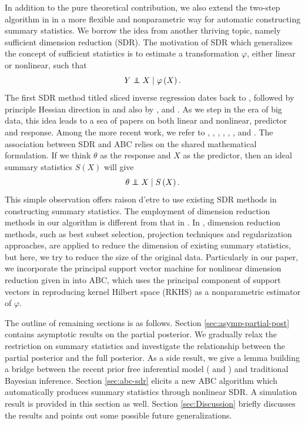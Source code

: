 In addition to the pure theoretical contribution, we also extend the{}
{two-step}{} algorithm in \citet{fearnhead2012constructing}
in a more flexible and nonparametric way for automatic constructing
summary statistics. We borrow the idea from another thriving topic,
namely sufficient dimension reduction (SDR). The motivation of SDR
which generalizes the concept of sufficient statistics is to estimate{}
{a} transformation $\varphi$, either{}
linear or nonlinear, such that 
\begin{equation}
Y\independent X\mid\varphi\left(X\right).\label{eq:sdr}
\end{equation}
 The first SDR method titled sliced inverse regression dates back
to \citet{li1991sliced}, followed by principle Hessian direction
in \citet{li1992principal} and also by \citet{1991}, and \citet{cook1998principal}.
As we step in the era of big data, this idea leads to a sea of papers
on both linear and nonlinear, predictor and response. Among the more
recent work, we refer to \citet{cook2002dimension}, \citet{xia2002adaptive},
\citet{li2005contour}, \citet{li2009dimension}, \citet{wu2008kernel},
\citet{yeh2009nonlinear}, \citet{su2011partial} and \citet{su2012inner}.
The association between SDR and ABC relies on the shared mathematical
formulation. If we think $\theta$ as the response and $X$ as the
predictor, then an ideal summary statistics $S\left(X\right)$ will
give 
\[
\theta\independent X\mid S\left(X\right).
\]
This simple observation offers raison d'etre to use existing SDR methods
in constructing summary statistics. The employment of dimension reduction
methods in our algorithm is different from that in \citet{blum2013comparative}.
In \citet{blum2013comparative}, dimension reduction methods, such
as best subset selection, projection techniques and regularization
approaches, are applied to reduce the dimension of existing summary
statistics, but here, we try to reduce the size of the original data.
Particularly in our paper, we incorporate the principal  support vector
machine for nonlinear dimension reduction given in \citet{li2011principal}
into ABC, which uses the{} {principal
} component of support vectors in reproducing kernel Hilbert space
(RKHS) as a nonparametric estimator of $\varphi$. 

The outline of remaining sections is as follows. Section \ref{sec:asymp-partial-post}
contains asymptotic results on the partial posterior. We gradually
relax the restriction on summary statistics and investigate the relationship
between the partial posterior and the full posterior. As a side result,
we give a lemma building a bridge between the recent prior free inferential
model (\citet{martin2013inferential} and \citet{martin2015conditional})
and traditional Bayesian inference. Section \ref{sec:abc-sdr} elicits
a new ABC algorithm which automatically produces summary statistics
through nonlinear SDR. A simulation result is provided in this section{}
{as well}. Section \ref{sec:Discussion} briefly
discusses the results and points out some possible future generalizations.


